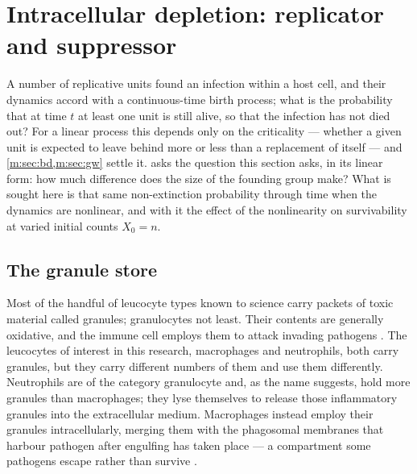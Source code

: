 
\section{Intracellular depletion: replicator and suppressor}
\label{path:sec:intracellular}

A number of replicative units found an infection within a host cell, and
their dynamics accord with a continuous-time birth process; what is the
probability that at time $t$ at least one unit is still alive, so that the
infection has not died out? For a linear process this depends only on the
criticality --- whether a given unit is expected to leave behind more or
less than a replacement of itself --- and \cref{m:sec:bd,m:sec:gw} settle
it.  asks the question this section asks, in its
linear form: how much difference does the size of the founding group make?
What is sought here is that same non-extinction probability through time
when the dynamics are nonlinear, and with it the effect of the nonlinearity
on survivability at varied initial counts $X_0=n$.

\subsection{The granule store}
\label{path:sec:granules}

Most of the handful of leucocyte types known to science carry packets of
toxic material called granules; granulocytes not least. Their contents are
generally oxidative, and the immune cell employs them to attack invading
pathogens \cite{jones2012subversion,cowley2011immunity}. The leucocytes of
interest in this research, macrophages and neutrophils, both carry granules,
but they carry different numbers of them and use them differently.
Neutrophils are of the category granulocyte and, as the name suggests, hold
more granules than macrophages; they lyse themselves to release those
inflammatory granules into the extracellular medium. Macrophages instead
employ their granules intracellularly, merging them with the phagosomal
membranes that harbour pathogen after engulfing has taken place --- a
compartment some pathogens escape rather than survive
\cite{golovliov2003attenuated}.

